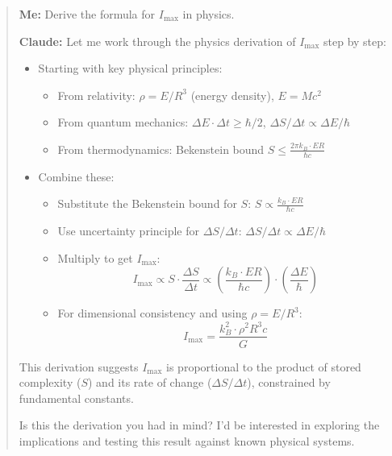 \documentclass[12pt]{article}
\begin{document}
\begin{quote}
\textbf{Me:} Derive the formula for $I_{\text{max}}$ in physics.

\textbf{Claude:} Let me work through the physics derivation of $I_{\text{max}}$ step by step:

\begin{itemize}
    \item Starting with key physical principles:
    \begin{itemize}
        \item From relativity: $\rho = E/R^3$ (energy density), $E = Mc^2$
        \item From quantum mechanics: $\Delta E \cdot \Delta t \geq \hbar/2$, $\Delta S/\Delta t \propto \Delta E/\hbar$
        \item From thermodynamics: Bekenstein bound $S \leq \frac{2\pi k_B \cdot E R}{\hbar c}$
    \end{itemize}
    \item Combine these:
    \begin{itemize}
        \item Substitute the Bekenstein bound for $S$: $S \propto \frac{k_B \cdot E R}{\hbar c}$
        \item Use uncertainty principle for $\Delta S/\Delta t$: $\Delta S/\Delta t \propto \Delta E/\hbar$
        \item Multiply to get $I_{\text{max}}$: 
        \[
        I_{\text{max}} \propto S \cdot \frac{\Delta S}{\Delta t} \propto \left( \frac{k_B \cdot E R}{\hbar c} \right) \cdot \left( \frac{\Delta E}{\hbar} \right)
        \]
        \item For dimensional consistency and using $\rho = E/R^3$:
        \[
        I_{\text{max}} = \frac{k_B^2 \cdot \rho^2 R^3 c}{G}
        \]
    \end{itemize}
\end{itemize}

This derivation suggests $I_{\text{max}}$ is proportional to the product of stored complexity ($S$) and its rate of change ($\Delta S/\Delta t$), constrained by fundamental constants.

Is this the derivation you had in mind? I'd be interested in exploring the implications and testing this result against known physical systems.
\end{quote}
\end{document}
